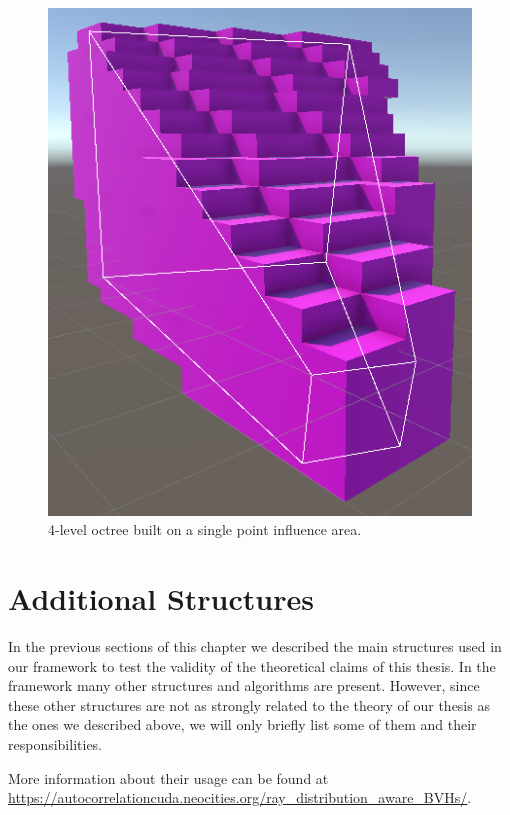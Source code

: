 \documentclass{PoliMi_MasterThesis}
\begin{document}
\begin{figure}[H]
    \centering
    \includegraphics[width=\textwidth]{Images/octree_visualizer.png}
    \caption{4-level octree built on a single point influence area.}
    \label{fig:octree_visualizer}
\end{figure}

\section{Additional Structures} \label{sec:additional_structures}
In the previous sections of this chapter we described the main structures used in our framework to test the validity of the theoretical claims of this thesis. In the framework many other structures and algorithms are present. However, since these other structures are not as strongly related to the theory of our thesis as the ones we described above, we will only briefly list some of them and their responsibilities.

More information about their usage can be found at \url{https://autocorrelationcuda.neocities.org/ray_distribution_aware_BVHs/}.
\end{document}

